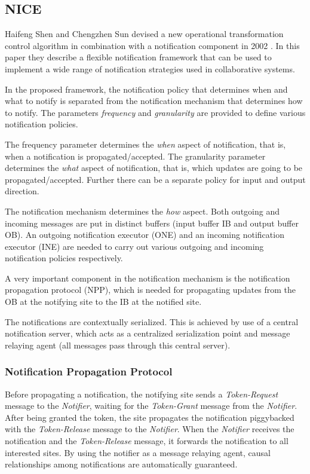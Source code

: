 \subsection{NICE}
\label{algo:nice}

Haifeng Shen and Chengzhen Sun devised a new operational transformation control algorithm in combination with a notification component in 2002 \cite{sun02}. In this paper they describe a flexible notification framework that can be used to implement a wide range of notification strategies used in collaborative systems.

In the proposed framework, the notification policy that determines when and what to notify is separated from the notification mechanism that determines how to notify. The parameters \emph{frequency} and \emph{granularity} are provided to define various notification policies. 

The frequency parameter determines the \emph{when} aspect of notification, that is, when a notification is propagated/accepted. The granularity parameter determines the \emph{what} aspect of notification, that is, which updates are going to be propagated/accepted. Further there can be a separate policy for input and output direction.

The notification mechanism determines the \emph{how} aspect. Both outgoing and incoming messages are put in distinct buffers (input buffer IB and output buffer OB). An outgoing notification executor (ONE) and an incoming notification executor (INE) are needed to carry out various outgoing and incoming notification policies respectively.

A very important component in the notification mechanism is the notification propagation protocol (NPP), which is needed for propagating updates from the OB at the notifying site to the IB at the notified site.

The notifications are contextually serialized. This is achieved by use of a central notification server, which acts as a centralized serialization point and message relaying agent (all messages pass through this central server). 


\subsubsection{Notification Propagation Protocol}
Before propagating a notification, the notifying site sends a \emph{Token-Request} message to the \emph{Notifier}, waiting for the \emph{Token-Grant} message from the \emph{Notifier}. After being granted the token, the site propagates the notification piggybacked with the \emph{Token-Release} message to the \emph{Notifier}. When the \emph{Notifier} receives the notification and the \emph{Token-Release} message, it forwards the notification to all interested sites. By using the notifier as a message relaying agent, causal relationships among notifications are automatically guaranteed.

